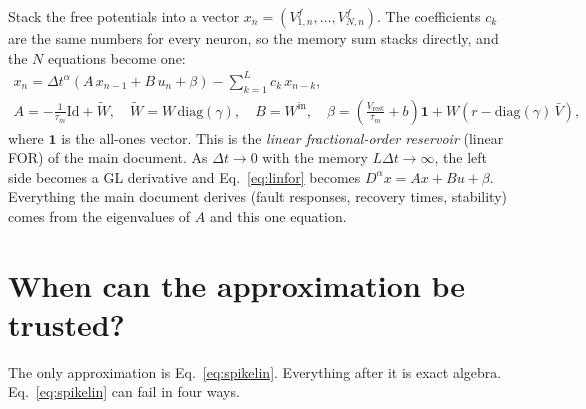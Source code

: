 \documentclass[11pt,a4paper]{article}
\newcommand{\Wt}{\tilde W}
\newcommand{\Vrest}{V_{\mathrm{rest}}}
\begin{document}
Stack the free potentials into a vector $x_n = (V^f_{1,n}, \dots, V^f_{N,n})$. The coefficients $c_k$ are the same numbers for every neuron, so the memory sum stacks directly, and the $N$ equations become one:
\begin{equation}
\begin{gathered}
x_n = \Delta t^{\alpha}\left( A\, x_{n-1} + B\, u_n + \beta \right) - \sum_{k=1}^{L} c_k\, x_{n-k}, \\
A = -\tfrac{1}{\tau_m}\mathrm{Id} + \Wt, \quad \Wt = W\,\mathrm{diag}(\gamma), \quad B = W^{\mathrm{in}}, \quad
\beta = \left( \tfrac{\Vrest}{\tau_m} + b \right)\mathbf{1} + W\left( r - \mathrm{diag}(\gamma)\,\bar V \right),
\end{gathered}
\label{eq:linfor}
\end{equation}
where $\mathbf{1}$ is the all-ones vector. This is the \emph{linear fractional-order reservoir} (linear FOR) of the main document. As $\Delta t \to 0$ with the memory $L\Delta t \to \infty$, the left side becomes a GL derivative and Eq.~\eqref{eq:linfor} becomes $D^{\alpha} x = A x + B u + \beta$. Everything the main document derives (fault responses, recovery times, stability) comes from the eigenvalues of $A$ and this one equation.

\section{When can the approximation be trusted?}
\label{sec:accuracy}

The only approximation is Eq.~\eqref{eq:spikelin}. Everything after it is exact algebra. Eq.~\eqref{eq:spikelin} can fail in four ways.
\end{document}
